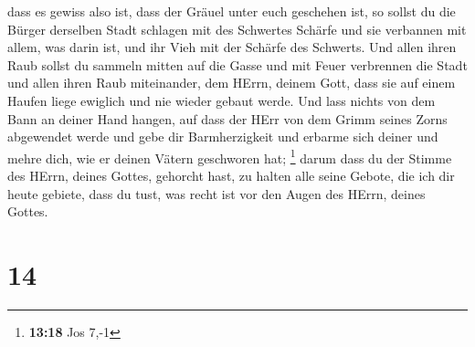 dass es gewiss also ist, dass der Gräuel unter euch geschehen ist,
 so sollst du die Bürger derselben Stadt schlagen mit des
Schwertes Schärfe und sie verbannen mit allem, was darin ist, und ihr
Vieh mit der Schärfe des Schwerts.  Und allen ihren Raub
sollst du sammeln mitten auf die Gasse und mit Feuer verbrennen die
Stadt und allen ihren Raub miteinander, dem HErrn, deinem Gott, dass sie
auf einem Haufen liege ewiglich und nie wieder gebaut werde.
 Und lass nichts von dem Bann an deiner Hand hangen, auf
dass der HErr von dem Grimm seines Zorns abgewendet werde und gebe dir
Barmherzigkeit und erbarme sich deiner und mehre dich, wie er deinen
Vätern geschworen hat; \footnote{\textbf{13:18} Jos 7,-1}
 darum dass du der Stimme des HErrn, deines Gottes,
gehorcht hast, zu halten alle seine Gebote, die ich dir heute gebiete,
dass du tust, was recht ist vor den Augen des HErrn, deines Gottes.

\hypertarget{section-13}{%
\section{14}\label{section-13}}

